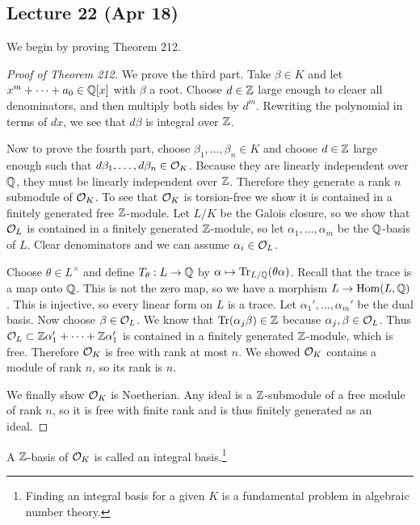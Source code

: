 \documentclass[10pt, twoside]{article}
\begin{document}
        \subsection{Lecture 22 (Apr 18)}
        We begin by proving Theorem 212.
        \begin{proof}[Proof of Theorem 212]
            We prove the third part. Take $\beta \in K$ and let $x^m + \cdots + a_0 \in \mathbb{Q}[x]$ with $\beta$ a root. Choose $d \in \mathbb{Z}$ large enough to cleaer all denominators, and then multiply both sides by $d^m$. Rewriting the polynomial in terms of $dx$, we see that $d\beta$ is integral over $\mathbb{Z}$.

            Now to prove the fourth part, choose $\beta_1, \ldots, \beta_n \in K$ and choose $d \in \mathbb{Z}$ large enough such that $d\beta_1, \ldots, d \beta_n \in \mathcal{O}_K$. Because they are linearly independent over $\mathbb{Q}$, they must be linearly independent over $\mathbb{Z}$. Therefore they generate a rank $n$ submodule of $\mathcal{O}_K$. To see that $\mathcal{O}_K$ is torsion-free we show it is contained in a finitely generated free $\mathbb{Z}$-module. Let $L/K$ be the Galois closure, so we show that $\mathcal{O}_L$ is contained in a finitely generated $\mathbb{Z}$-module, so let $\alpha_1, \ldots, \alpha_m$ be the $\mathbb{Q}$-basis of $L$. Clear denominators and we can assume $\alpha_i \in \mathcal{O}_L$. 
            
            Choose $\theta \in L^{\times}$ and define $T_{\theta}:L \to \mathbb{Q}$ by $\alpha \mapsto \mathrm{Tr}_{L/\mathbb{Q}}(\theta \alpha)$. Recall that the trace is a map onto $\mathbb{Q}$. This is not the zero map, so we have a morphism $L \to \operatorname{Hom}(L,\mathbb{Q})$. This is injective, so every linear form on $L$ is a trace. Let $\alpha_1', \ldots, \alpha_m'$ be the dual basis. Now choose $\beta \in \mathcal{O}_L$. We know that $\mathrm{Tr}(\alpha_j\beta) \in \mathbb{Z}$ because $\alpha_j, \beta \in \mathcal{O}_L$. Thus $\mathcal{O}_L \subset \mathbb{Z} \alpha_1' + \cdots + \mathbb{Z} \alpha_1'$ is contained in a finitely generated $\mathbb{Z}$-module, which is free. Therefore $\mathcal{O}_K$ is free with rank at most $n$. We showed $\mathcal{O}_K$ contains a module of rank $n$, so its rank is $n$.

            We finally show $\mathcal{O}_K$ is Noetherian. Any ideal is a $\mathbb{Z}$-submodule of a free module of rank $n$, so it is free with finite rank and is thus finitely generated as an ideal.
        \end{proof}

        \begin{defn}
            A $\mathbb{Z}$-basis of $\mathcal{O}_K$ is called an integral basis.\footnote{Finding an integral basis for a given $K$ is a fundamental problem in algebraic number theory.}
        \end{defn}
        
\end{document}
